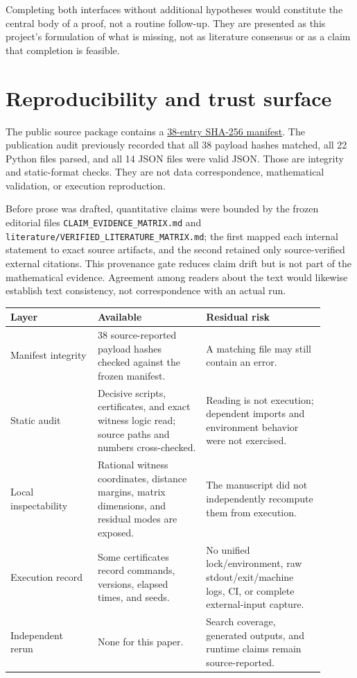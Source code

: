 \documentclass[11pt]{article}
\newcommand{\assetpath}{../assets/yuanjiang_kakeya_recollision_assets_2026-08-11/unpacked/}
\begin{document}
Completing both interfaces without additional hypotheses would constitute the central body of a proof, not a routine follow-up. They are presented as this project's formulation of what is missing, not as literature consensus or as a claim that completion is feasible.

\section{Reproducibility and trust surface}
\label{sec:repro}

The public source package contains a
\href{\assetpath SHA256SUMS_2026-08-13.txt}{38-entry SHA-256 manifest}.
The publication audit previously recorded that all 38 payload hashes matched, all 22 Python files parsed, and all 14 JSON files were valid JSON. Those are integrity and static-format checks. They are not data correspondence, mathematical validation, or execution reproduction.

Before prose was drafted, quantitative claims were bounded by the frozen editorial files \texttt{CLAIM\_EVIDENCE\_MATRIX.md} and \texttt{literature/VERIFIED\_LITERATURE\_MATRIX.md}; the first mapped each internal statement to exact source artifacts, and the second retained only source-verified external citations. This provenance gate reduces claim drift but is not part of the mathematical evidence. Agreement among readers about the text would likewise establish text consistency, not correspondence with an actual run.

\begin{center}
\begin{tabular}{p{0.25\linewidth}p{0.31\linewidth}p{0.34\linewidth}}
\toprule
Layer & Available & Residual risk \\
\midrule
Manifest integrity & 38 source-reported payload hashes checked against the frozen manifest. & A matching file may still contain an error. \\
Static audit & Decisive scripts, certificates, and exact witness logic read; source paths and numbers cross-checked. & Reading is not execution; dependent imports and environment behavior were not exercised. \\
Local inspectability & Rational witness coordinates, distance margins, matrix dimensions, and residual modes are exposed. & The manuscript did not independently recompute them from execution. \\
Execution record & Some certificates record commands, versions, elapsed times, and seeds. & No unified lock/environment, raw stdout/exit/machine logs, CI, or complete external-input capture. \\
Independent rerun & None for this paper. & Search coverage, generated outputs, and runtime claims remain source-reported. \\
\bottomrule
\end{tabular}
\end{center}
\end{document}
